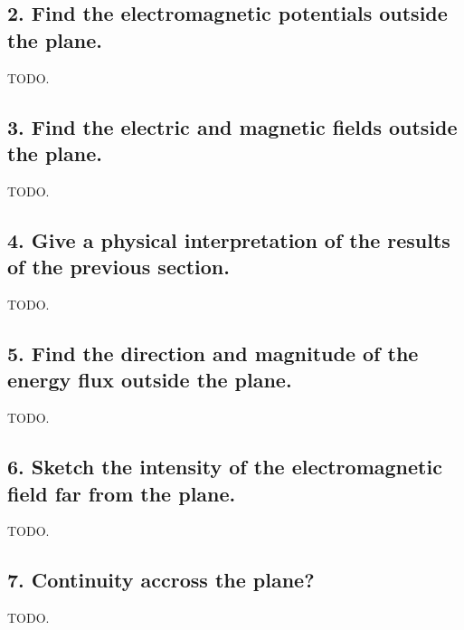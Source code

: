 \subsection{2.  Find the electromagnetic potentials outside the plane.}

TODO. 

\subsection{3. Find the electric and magnetic fields outside the plane.}

TODO. 

\subsection{4. Give a physical interpretation of the results of the previous section.}

TODO. 

\subsection{5. Find the direction and magnitude of the energy flux outside the plane.}

TODO. 

\subsection{6. Sketch the intensity of the electromagnetic field far from the plane.}

TODO. 

\subsection{7. Continuity accross the plane?}

TODO. 

